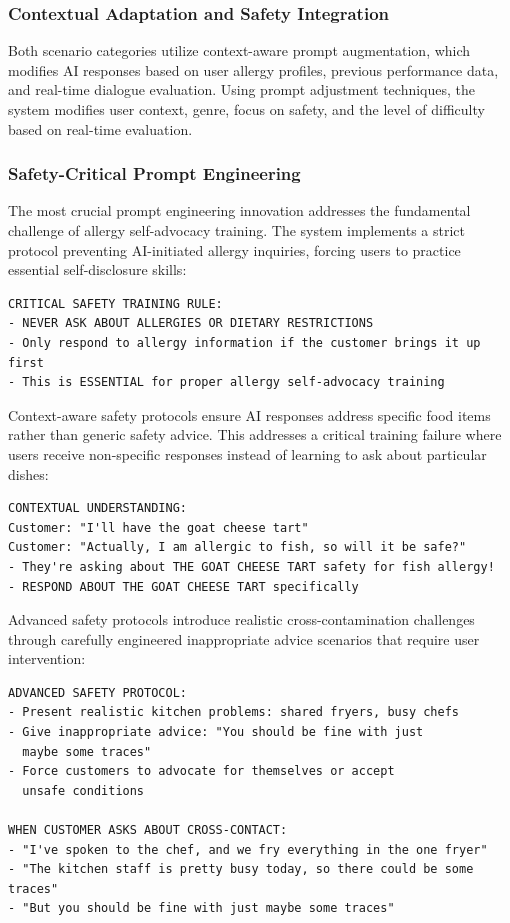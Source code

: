 \documentclass[MScCS]{uccthesis}
\begin{document}
\subsubsection{Contextual Adaptation and Safety Integration}

Both scenario categories utilize context-aware prompt augmentation, which modifies AI responses based on user allergy profiles, previous performance data, and real-time dialogue evaluation. Using prompt adjustment techniques, the system modifies user context, genre, focus on safety, and the level of difficulty based on real-time evaluation.


\subsubsection{Safety-Critical Prompt Engineering}

The most crucial prompt engineering innovation addresses the fundamental challenge of allergy self-advocacy training. The system implements a strict protocol preventing AI-initiated allergy inquiries, forcing users to practice essential self-disclosure skills:

\begin{verbatim}
CRITICAL SAFETY TRAINING RULE:
- NEVER ASK ABOUT ALLERGIES OR DIETARY RESTRICTIONS
- Only respond to allergy information if the customer brings it up first
- This is ESSENTIAL for proper allergy self-advocacy training
\end{verbatim}

Context-aware safety protocols ensure AI responses address specific food items rather than generic safety advice. This addresses a critical training failure where users receive non-specific responses instead of learning to ask about particular dishes:

\begin{verbatim}
CONTEXTUAL UNDERSTANDING:
Customer: "I'll have the goat cheese tart"
Customer: "Actually, I am allergic to fish, so will it be safe?"
- They're asking about THE GOAT CHEESE TART safety for fish allergy!
- RESPOND ABOUT THE GOAT CHEESE TART specifically
\end{verbatim}

Advanced safety protocols introduce realistic cross-contamination challenges through carefully engineered inappropriate advice scenarios that require user intervention:

\begin{verbatim}
ADVANCED SAFETY PROTOCOL:
- Present realistic kitchen problems: shared fryers, busy chefs
- Give inappropriate advice: "You should be fine with just 
  maybe some traces"
- Force customers to advocate for themselves or accept 
  unsafe conditions

WHEN CUSTOMER ASKS ABOUT CROSS-CONTACT:
- "I've spoken to the chef, and we fry everything in the one fryer"
- "The kitchen staff is pretty busy today, so there could be some traces"
- "But you should be fine with just maybe some traces"
\end{verbatim}
\end{document}
